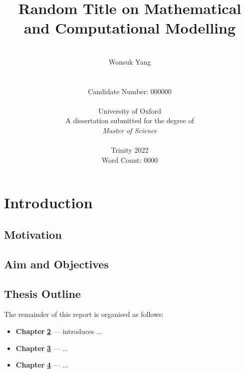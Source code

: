 \documentclass[12pt, a4paper]{report}
\date{}
\title{Random Title on Mathematical and Computational Modelling}
\author{\\ \Large{Wonsuk Yang}
\\
\\
\\ Candidate Number: 000000
\\
\\ University of Oxford
\\
A dissertation submitted for the degree of \\ \textit{Master of Science}
\\ \\
Trinity 2022
\\ \small{Word Count: 0000}
}
\begin{document}
\thispagestyle{headings}
	\maketitle
\FloatBarrier
{}

\thispagestyle{empty}
\begin{abstract}
\lipsum[1-2]

\end{abstract}
\tableofcontents


\chapter{Introduction}
\section{Motivation}
\lipsum[1-3]
\section{Aim and Objectives}
\lipsum[6]
\section{Thesis Outline}
The remainder of this report is organised as follows:
\begin{itemize}
    \item[] \textbf{Chapter} \hyperref[Chap2]{\textbf{2}} --- introduces ...
    \item[] \textbf{Chapter} \hyperref[Chap3]{\textbf{3}} --- ...
    \item[] \textbf{Chapter} \hyperref[Chap4]{\textbf{4}} --- ...
\end{itemize}
\end{document}
